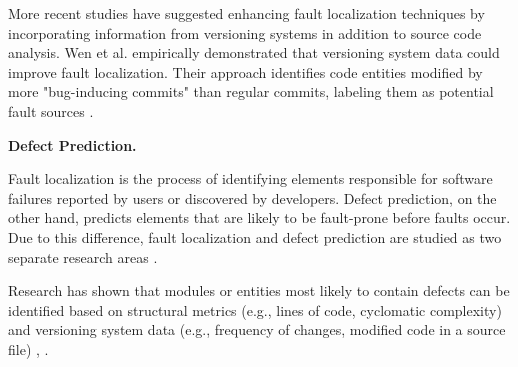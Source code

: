 More recent studies have suggested enhancing fault localization techniques by incorporating information from versioning systems in addition to source code analysis. Wen et al. empirically demonstrated that versioning system data could improve fault localization. Their approach identifies code entities modified by more "bug-inducing commits" than regular commits, labeling them as potential fault sources \cite{fault-versioning}.


\textbf{Defect Prediction.}

Fault localization is the process of identifying elements responsible for software failures reported by users or discovered by developers. Defect prediction, on the other hand, predicts elements that are likely to be fault-prone before faults occur. Due to this difference, fault localization and defect prediction are studied as two separate research areas \cite{error-prone, fault-survey}.  

Research has shown that modules or entities most likely to contain defects can be identified based on structural metrics (e.g., lines of code, cyclomatic complexity) and versioning system data (e.g., frequency of changes, modified code in a source file) \cite{67595}, \cite{1702015}.

